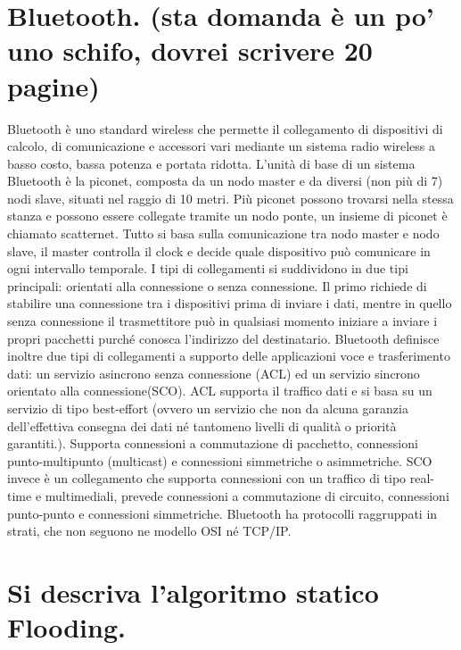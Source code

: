 \section{Bluetooth. (sta domanda è un po’ uno schifo, dovrei scrivere 20 pagine)}

Bluetooth è uno standard wireless che permette il collegamento di dispositivi di calcolo, di comunicazione e accessori vari mediante un sistema radio wireless a basso costo, bassa potenza e portata ridotta.
L’unità di base di un sistema Bluetooth è la piconet, composta da un nodo master e da diversi (non più di 7) nodi slave, situati nel raggio di 10 metri. Più piconet possono trovarsi nella stessa stanza e possono essere collegate tramite un nodo ponte, un insieme di piconet è chiamato scatternet.
Tutto si basa sulla comunicazione tra nodo master e nodo slave, il master controlla il clock e decide quale dispositivo può comunicare in ogni intervallo temporale.
I tipi di collegamenti si suddividono in due tipi principali: orientati alla connessione o senza connessione.
Il primo richiede di stabilire una connessione tra i dispositivi prima di inviare i dati, mentre in quello senza connessione il trasmettitore può in qualsiasi momento iniziare a inviare i propri pacchetti purché conosca l’indirizzo del destinatario.
Bluetooth definisce inoltre due tipi di collegamenti a supporto delle applicazioni voce e trasferimento dati: un servizio asincrono senza connessione (ACL) ed un servizio sincrono orientato alla connessione(SCO).
ACL supporta il traffico dati e si basa su un servizio di tipo best-effort (ovvero un servizio che non da alcuna garanzia dell’effettiva consegna dei dati né tantomeno livelli di qualità o priorità garantiti.).
Supporta connessioni a commutazione di pacchetto, connessioni punto-multipunto (multicast) e connessioni simmetriche o asimmetriche.
SCO invece è un collegamento che supporta connessioni con un traffico di tipo real-time e multimediali, prevede connessioni a commutazione di circuito, connessioni punto-punto e connessioni simmetriche.
Bluetooth ha protocolli raggruppati in strati, che non seguono ne modello OSI né TCP/IP.

\section{Si descriva l’algoritmo statico Flooding.}

